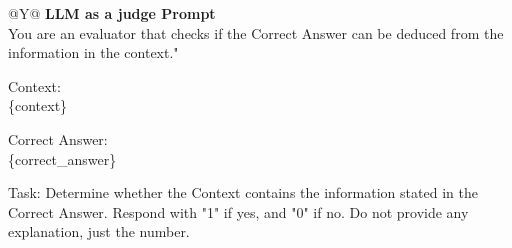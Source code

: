 \documentclass{article}
\theoremstyle{plain}
\theoremstyle{definition}
\theoremstyle{remark}
\begin{document}
\begin{table}[htb]
  \centering
  \caption{Implementation Details of LLM as a judge in Section 4.8}
  \label{tab:llm_as_judge2}
  \begin{tabularx}{\textwidth}{@{}Y@{}}
    \toprule
    \textbf{LLM as a judge Prompt} \\     %
    \midrule
    You are an evaluator that checks if the Correct Answer can be deduced from the information in the context."

    \par\medskip
    Context:\\
    \{context\}

    \par\medskip
    Correct Answer:\\
    \{correct\_answer\}

    \par\medskip
    Task:
    Determine whether the Context contains the information stated in the Correct Answer. 
    Respond with "1" if yes, and "0" if no. Do not provide any explanation, just the number.
    \\
    \bottomrule
  \end{tabularx}
\end{table}
\end{document}
